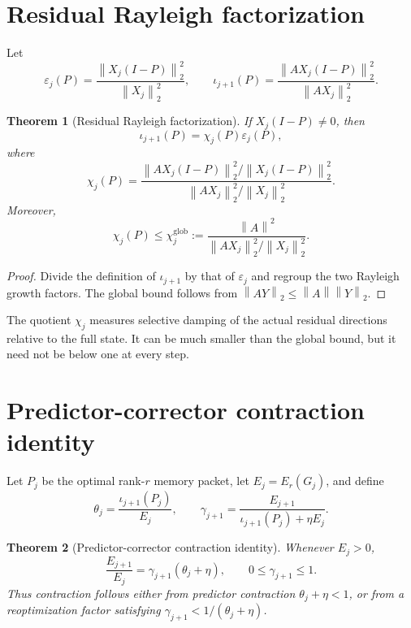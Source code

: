 \documentclass[11pt]{article}
\newtheorem{theorem}{Theorem}[section]
\theoremstyle{remark}
\newcommand{\norm}[1]{\left\lVert#1\right\rVert}
\begin{document}
\section{Residual Rayleigh factorization}

Let
\[
 \varepsilon_j(P)=\frac{\norm{X_j(I-P)}_2^2}{\norm{X_j}_2^2},
 \qquad
 \iota_{j+1}(P)=\frac{\norm{AX_j(I-P)}_2^2}{\norm{AX_j}_2^2}.
\]

\begin{theorem}[Residual Rayleigh factorization]
\label{thm:rayleigh}
If $X_j(I-P)\ne0$, then
\begin{equation}
 \boxed{\iota_{j+1}(P)=\chi_j(P)\varepsilon_j(P)},
 \label{eq:factorization}
\end{equation}
where
\[
 \chi_j(P)=
 \frac{\norm{AX_j(I-P)}_2^2/\norm{X_j(I-P)}_2^2}
 {\norm{AX_j}_2^2/\norm{X_j}_2^2}.
\]
Moreover,
\begin{equation}
 \chi_j(P)\le
 \chi_j^{\mathrm{glob}}
 :=\frac{\norm A^2}{\norm{AX_j}_2^2/\norm{X_j}_2^2}.
 \label{eq:global}
\end{equation}
\end{theorem}

\begin{proof}
Divide the definition of $\iota_{j+1}$ by that of $\varepsilon_j$ and regroup
the two Rayleigh growth factors.  The global bound follows from
$\norm{AY}_2\le\norm A\norm Y_2$.
\end{proof}

The quotient $\chi_j$ measures selective damping of the actual residual
directions relative to the full state.  It can be much smaller than the
global bound, but it need not be below one at every step.

\section{Predictor-corrector contraction identity}

Let $P_j$ be the optimal rank-$r$ memory packet, let
$E_j=E_r(G_j)$, and define
\[
 \theta_j=\frac{\iota_{j+1}(P_j)}{E_j},
 \qquad
 \gamma_{j+1}=
 \frac{E_{j+1}}{\iota_{j+1}(P_j)+\eta E_j}.
\]

\begin{theorem}[Predictor-corrector contraction identity]
\label{thm:pc}
Whenever $E_j>0$,
\begin{equation}
 \boxed{
 \frac{E_{j+1}}{E_j}=\gamma_{j+1}(\theta_j+\eta),
 \qquad 0\le\gamma_{j+1}\le1.}
 \label{eq:pc}
\end{equation}
Thus contraction follows either from predictor contraction
$\theta_j+\eta<1$, or from a reoptimization factor satisfying
$\gamma_{j+1}<1/(\theta_j+\eta)$.
\end{theorem}
\end{document}
